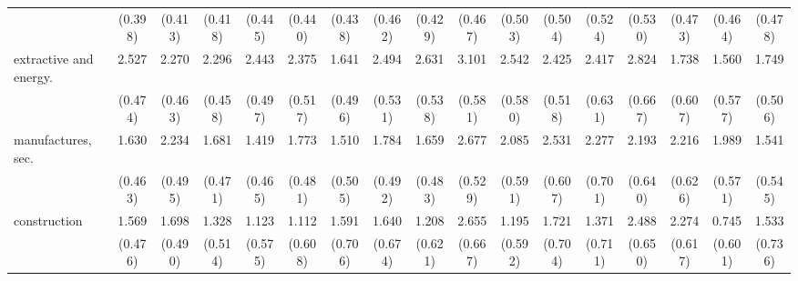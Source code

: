 {\begin{tabular}{l*{16}{c}}
                    &     (0.398)         &     (0.413)         &     (0.418)         &     (0.445)         &     (0.440)         &     (0.438)         &     (0.462)         &     (0.429)         &     (0.467)         &     (0.503)         &     (0.504)         &     (0.524)         &     (0.530)         &     (0.473)         &     (0.464)         &     (0.478)         \\
[1em]
extractive and energy.&       2.527\sym{***}&       2.270\sym{***}&       2.296\sym{***}&       2.443\sym{***}&       2.375\sym{***}&       1.641\sym{***}&       2.494\sym{***}&       2.631\sym{***}&       3.101\sym{***}&       2.542\sym{***}&       2.425\sym{***}&       2.417\sym{***}&       2.824\sym{***}&       1.738\sym{**} &       1.560\sym{**} &       1.749\sym{***}\\
                    &     (0.474)         &     (0.463)         &     (0.458)         &     (0.497)         &     (0.517)         &     (0.496)         &     (0.531)         &     (0.538)         &     (0.581)         &     (0.580)         &     (0.518)         &     (0.631)         &     (0.667)         &     (0.607)         &     (0.577)         &     (0.506)         \\
[1em]
manufactures, sec.  &       1.630\sym{***}&       2.234\sym{***}&       1.681\sym{***}&       1.419\sym{**} &       1.773\sym{***}&       1.510\sym{**} &       1.784\sym{***}&       1.659\sym{***}&       2.677\sym{***}&       2.085\sym{***}&       2.531\sym{***}&       2.277\sym{**} &       2.193\sym{***}&       2.216\sym{***}&       1.989\sym{***}&       1.541\sym{**} \\
                    &     (0.463)         &     (0.495)         &     (0.471)         &     (0.465)         &     (0.481)         &     (0.505)         &     (0.492)         &     (0.483)         &     (0.529)         &     (0.591)         &     (0.607)         &     (0.701)         &     (0.640)         &     (0.626)         &     (0.571)         &     (0.545)         \\
[1em]
construction        &       1.569\sym{***}&       1.698\sym{***}&       1.328\sym{**} &       1.123         &       1.112         &       1.591\sym{*}  &       1.640\sym{*}  &       1.208         &       2.655\sym{***}&       1.195\sym{*}  &       1.721\sym{*}  &       1.371         &       2.488\sym{***}&       2.274\sym{***}&       0.745         &       1.533\sym{*}  \\
                    &     (0.476)         &     (0.490)         &     (0.514)         &     (0.575)         &     (0.608)         &     (0.706)         &     (0.674)         &     (0.621)         &     (0.667)         &     (0.592)         &     (0.704)         &     (0.711)         &     (0.650)         &     (0.617)         &     (0.601)         &     (0.736)         \\

\end{tabular}}
